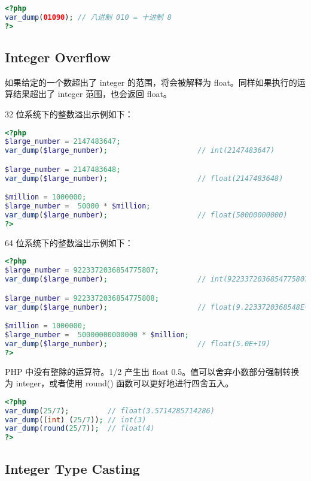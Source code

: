 \begin{lstlisting}[language=PHP]
<?php
var_dump(01090); // 八进制 010 = 十进制 8
?>
\end{lstlisting}

\subsection{Integer Overflow}


如果给定的一个数超出了 integer 的范围，将会被解释为 float。同样如果执行的运算结果超出了 integer 范围，也会返回 float。

32 位系统下的整数溢出示例如下：

\begin{lstlisting}[language=PHP]
<?php
$large_number = 2147483647;
var_dump($large_number);                     // int(2147483647)

$large_number = 2147483648;
var_dump($large_number);                     // float(2147483648)

$million = 1000000;
$large_number =  50000 * $million;
var_dump($large_number);                     // float(50000000000)
?>
\end{lstlisting}

64 位系统下的整数溢出示例如下：

\begin{lstlisting}[language=PHP]
<?php
$large_number = 9223372036854775807;
var_dump($large_number);                     // int(9223372036854775807)

$large_number = 9223372036854775808;
var_dump($large_number);                     // float(9.2233720368548E+18)

$million = 1000000;
$large_number =  50000000000000 * $million;
var_dump($large_number);                     // float(5.0E+19)
?>
\end{lstlisting}

PHP 中没有整除的运算符。1/2 产生出 float 0.5。值可以舍弃小数部分强制转换为 integer，或者使用 round() 函数可以更好地进行四舍五入。

\begin{lstlisting}[language=PHP]
<?php
var_dump(25/7);         // float(3.5714285714286) 
var_dump((int) (25/7)); // int(3)
var_dump(round(25/7));  // float(4) 
?>
\end{lstlisting}

\subsection{Integer Type Casting}


